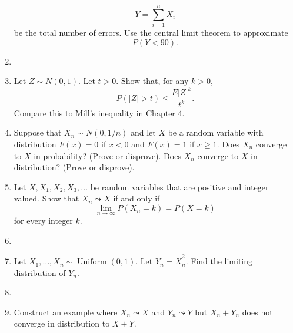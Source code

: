 \documentclass{article}
\begin{document}
\begin{enumerate}
	$$
	Y = \sum_{i = 1}^n X_i
	$$
	be the total number of errors. Use the central limit theorem to approximate
	$$
	P(Y < 90).
	$$
	\item
	\item Let $Z \sim N(0, 1)$. Let $t > 0$. Show that, for any $k > 0$,
	$$
	P(|Z| > t) \leq \frac{E|Z|^k}{t^k}.
	$$
	Compare this to Mill's inequality in Chapter 4.
	\item Suppose that $X_n \sim N(0, 1/n)$ and let $X$ be a random variable with distribution $F(x) = 0$ if $x < 0$ and $F(x) = 1$ if $x \geq 1$. Does $X_n$ converge to $X$ in probability? (Prove or disprove). Does $X_n$ converge to $X$ in distribution? (Prove or disprove).
	\item Let $X, X_1, X_2, X_3, \dots$ be random variables that are positive and integer valued. Show that $X_n \leadsto X$ if and only if
	$$
	\lim_{n \rightarrow \infty} P(X_n = k) = P(X = k)
	$$
	for every integer $k$.
	\item
	\item Let $X_1, \dots, X_n \sim \operatorname{Uniform}(0, 1)$. Let $Y_n = \overline{X}_n^2$. Find the limiting distribution of $Y_n$.
	\item
	\item Construct an example where $X_n \leadsto X$ and $Y_n \leadsto Y$ but $X_n + Y_n$ does not converge in distribution to $X + Y$.
\end{enumerate}
\end{document}
